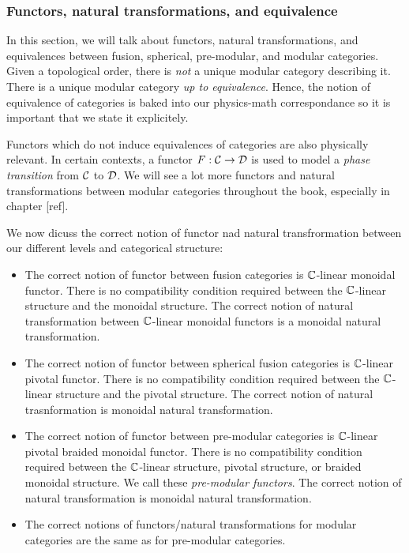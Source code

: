 \subsubsection{Functors, natural transformations, and equivalence}

In this section, we will talk about functors, natural transformations, and equivalences between fusion, spherical, pre-modular, and modular categories. Given a topological order, there is {\em not} a unique modular category describing it. There is a unique modular category {\em up to equivalence}. Hence, the notion of equivalence of categories is baked into our physics-math correspondance so it is important that we state it explicitely.

\begin{rem}
Functors which do not induce equivalences of categories are also physically relevant. In certain contexts, a functor $F:{\mathcal C}\to {\mathcal D}$ is used to model a {\em phase transition} from ${\mathcal C}$ to ${\mathcal D}$. We will see a lot more functors and natural transformations between modular categories throughout the book, especially in chapter [ref].
\end{rem}

We now dicuss the correct notion of functor nad natural transfrormation between our different levels and categorical structure:

\begin{itemize}
\item The correct notion of functor between fusion categories is ${\mathbb C}$-linear monoidal functor. There is no compatibility condition required between the ${\mathbb C}$-linear structure and the monoidal structure. The correct notion of natural transformation between ${\mathbb C}$-linear monoidal functors is a monoidal natural transformation.

\item The correct notion of functor between spherical fusion categories is ${\mathbb C}$-linear pivotal functor. There is no compatibility condition required between the ${\mathbb C}$-linear structure and the pivotal structure. The correct notion of natural trasnformation is monoidal natural transformation.

\item The correct notion of functor between pre-modular categories is ${\mathbb C}$-linear pivotal braided monoidal functor. There is no compatibility condition required between the ${\mathbb C}$-linear structure, pivotal structure, or braided monoidal structure. We call these {\em pre-modular functors}. The correct notion of natural transformation is monoidal natural transformation.

\item The correct notions of functors/natural transformations for modular categories are the same as for pre-modular categories.
\end{itemize}

